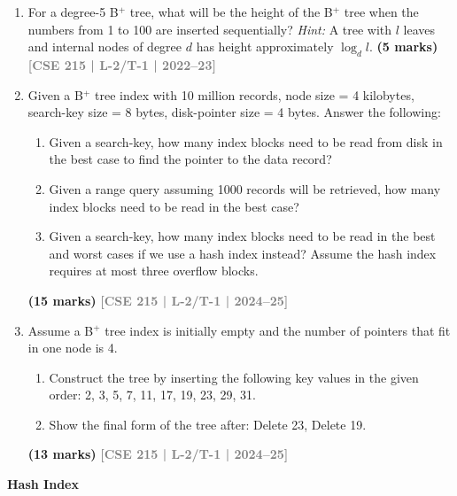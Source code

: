 \documentclass[12pt,a3paper]{article}
\newcommand{\yr}[1]{\hfill\textcolor{gray}{\small\textbf{[#1]}}}
\newcommand{\mk}[1]{\textcolor{orange!70!black}{\small\textbf{(#1 marks)}}}
\newcommand{\subtopic}[2]{%
  \vspace{10pt}
  \noindent\begin{tcolorbox}[colback=#1!8,colframe=#1,boxrule=0.6pt,arc=4pt,
    left=6pt,right=6pt,top=4pt,bottom=4pt]
    \small\bfseries\textcolor{#1}{#2}
  \end{tcolorbox}
  \vspace{2pt}
}
\begin{document}
\begin{enumerate}
\item For a degree-5 B$^+$ tree, what will be the height of the B$^+$ tree when the numbers from 1 to 100 are inserted sequentially? \textit{Hint:} A tree with $l$ leaves and internal nodes of degree $d$ has height approximately $\log_d l$.
\mk{5} \yr{CSE 215 | L-2/T-1 | 2022--23}

\item Given a B$^+$ tree index with 10 million records, node size = 4 kilobytes, search-key size = 8 bytes, disk-pointer size = 4 bytes. Answer the following:
\begin{enumerate}
  \item Given a search-key, how many index blocks need to be read from disk in the best case to find the pointer to the data record?
  \item Given a range query assuming 1000 records will be retrieved, how many index blocks need to be read in the best case?
  \item Given a search-key, how many index blocks need to be read in the best and worst cases if we use a hash index instead? Assume the hash index requires at most three overflow blocks.
\end{enumerate}
\mk{15} \yr{CSE 215 | L-2/T-1 | 2024--25}

\item Assume a B$^+$ tree index is initially empty and the number of pointers that fit in one node is 4.
\begin{enumerate}
  \item Construct the tree by inserting the following key values in the given order: 2, 3, 5, 7, 11, 17, 19, 23, 29, 31.
  \item Show the final form of the tree after: Delete 23, Delete 19.
\end{enumerate}
\mk{13} \yr{CSE 215 | L-2/T-1 | 2024--25}

\end{enumerate}

\subtopic{cD}{Hash Index}
\label{sub:s5-hash}
\end{document}
